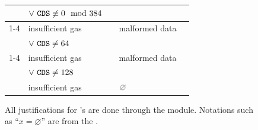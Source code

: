 \begin{figure}[!h]
{\begin{tabular}{|l||l|c|l|c|}
                                                  & $\vee~\texttt{CDS} \not \equiv 0 \mod 384$             &                           &                                                                   &                                                  \\ \cline{1-4}
		\instBlsMapFpToGOne{}             & insufficient gas                               & \multirow{2}{*}{\toOob}   & malformed data                                                    &                                                  \\
                                                  & $\vee~\texttt{CDS} \neq  64$                           &                           &                                                                   &                                                  \\ \cline{1-4}
		\instBlsMapFpTwoToGTwo{}          & insufficient gas                               & \multirow{2}{*}{\toOob}   & malformed data                                                    &                                                  \\
                                                  & $\vee~\texttt{CDS} \neq 128$                           &                           &                                                                   &                                                  \\ \hline \hline
			\instPVerify{}                    & insufficient gas                               & \toOob                    & $\nothing$                                                        & \multirow{2}{*}{\text{\cite{EIP-7951}, Osaka}}   \\ \hline
		\end{tabular}
		}
		\label{hub: instruction handling: call: precompiles: table classifying failures known to the HUB vs. to RAM}
	\caption{All justifications for \scenPrcFailureKnownToHub{}'s are done through the \oobMod{} module. Notations such as ``$x = \varnothing$'' are from the \cite{EYP-London}.}
\end{figure}

